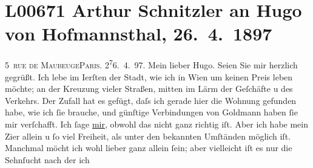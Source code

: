 

\section[Arthur Schnitzler an Hugo von Hofmannsthal, 26. 4. 1897]{L00671 Arthur Schnitzler an Hugo von Hofmannsthal, 26. 4. 1897}
\nopagebreak{}
\rehead{ }\normalsize\beginnumbering{}
\toendnotes[C]{\smallbreak\pagebreak[2]}
\toendnotes[C]{\smallbreak}
\pstart
           \raggedleft{}{\pb}5 \textsc{rue \introOben{}de\introOben{} Maubeuge}\textsc{Paris}. 2\substVorne{}\textsuperscript{7}\substDazwischen{}6\substHinten{}. 4. 97.\pend
           \vspace{0.5em}
\pstart
           Mein lieber Hugo. Seien Sie mir herzlich gegrüßt. Ich lebe im I{\geminationn}erſten der Stadt, wie ich in Wien um keinen Preis leben möchte; an der Kreuzung vieler
               Straßen, mitten im Lärm der Geſchäfte u des Verkehrs. Der Zufall hat es gefügt, daſs
               ich gerade hier die Wohnung gefunden habe, wie ich ſie brauche, und günſtige
               Verbindungen von Goldmann haben ſie mir
               verſchafft. Ich ſage \uline{mir}, obwohl das nicht ganz richtig iſt. Aber ich habe
               mein Zi{\geminationm}er allein u ſo viel Freiheit, als unter den
               bekannten Umſtänden möglich iſt. Manchmal möcht ich wohl lieber ganz allein ſein;
               aber vielleicht iſt {\pb}es nur die Sehnſucht nach der ich
